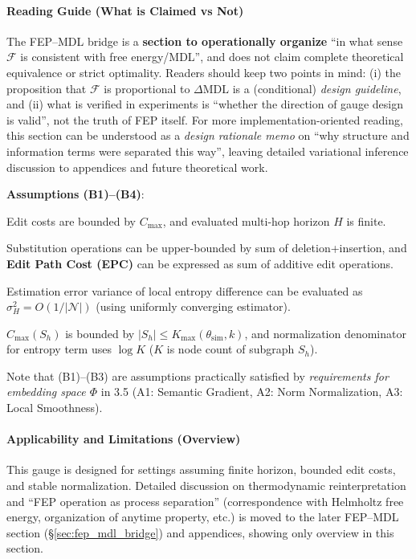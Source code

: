 \documentclass[12pt]{article}
\newcommand{\F}{\mathcal{F}}
\begin{document}
\paragraph{Reading Guide (What is Claimed vs Not)}
The FEP--MDL bridge is a \textbf{section to operationally organize} ``in what sense $\F$ is consistent with free energy/MDL'', and does not claim complete theoretical equivalence or strict optimality.
Readers should keep two points in mind: (i) the proposition that $\F$ is proportional to $\Delta\mathrm{MDL}$ is a (conditional) \emph{design guideline}, and (ii) what is verified in experiments is ``whether the direction of gauge design is valid'', not the truth of FEP itself.
For more implementation-oriented reading, this section can be understood as a \emph{design rationale memo} on ``why structure and information terms were separated this way'', leaving detailed variational inference discussion to appendices and future theoretical work.

\noindent \textbf{Assumptions (B1)--(B4)}:
\begin{description}[leftmargin=1.8em]
  \item[(B1) Local Boundedness] Edit costs are bounded by $C_{\max}$, and evaluated multi-hop horizon $H$ is finite.
  \item[(B2) Edit Decomposition] Substitution operations can be upper-bounded by sum of deletion+insertion, and \textbf{Edit Path Cost (EPC)} can be expressed as sum of additive edit operations.
  \item[(B3) Entropy Estimation] Estimation error variance of local entropy difference can be evaluated as $\sigma_H^2=O(1/|\mathcal{N}|)$ (using uniformly converging estimator).
  \item[(B4) Normalization Stability] $C_{\max}(S_h)$ is bounded by $|S_h| \le K_{\max}(\theta_{\mathrm{sim}},k)$, and normalization denominator for entropy term uses $\log K$ ($K$ is node count of subgraph $S_h$).
\end{description}
\noindent Note that (B1)--(B3) are assumptions practically satisfied by \emph{requirements for embedding space $\Phi$} in 3.5 (A1: Semantic Gradient, A2: Norm Normalization, A3: Local Smoothness).

\paragraph{Applicability and Limitations (Overview)}\label{sec:fep_mdl_bridge_applicability}
This gauge is designed for settings assuming finite horizon, bounded edit costs, and stable normalization. Detailed discussion on thermodynamic reinterpretation and ``FEP operation as process separation'' (correspondence with Helmholtz free energy, organization of anytime property, etc.) is moved to the later FEP--MDL section (\S\ref{sec:fep_mdl_bridge}) and appendices, showing only overview in this section.
\end{document}
